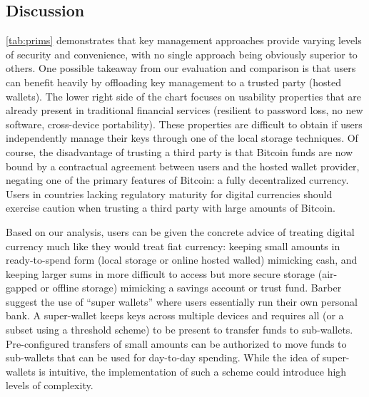 \subsection{Discussion}
\autoref{tab:prims} demonstrates that key management approaches provide varying levels of security and convenience, with no single approach being obviously superior to others. One possible takeaway from our evaluation and comparison is that users can benefit heavily by offloading key management to a trusted party (\eg hosted wallets). The lower right side of the chart focuses on usability properties that are already present in traditional financial services (\ie resilient to password loss, no new software, cross-device portability). These properties are difficult to obtain if users independently manage their keys through one of the local storage techniques. Of course, the disadvantage of trusting a third party is that Bitcoin funds are now bound by a contractual agreement between users and the hosted wallet provider, negating one of the primary features of Bitcoin: a fully decentralized currency. Users in countries lacking regulatory maturity for digital currencies should exercise caution when trusting a third party with large amounts of Bitcoin. 

Based on our analysis, users can be given the concrete advice of treating digital currency much like they would treat fiat currency: keeping small amounts in ready-to-spend form (\eg local storage or online hosted walled) mimicking cash, and keeping larger sums in more difficult to access but more secure storage (\eg air-gapped or offline storage) mimicking a savings account or trust fund. Barber \etal~\cite{Barber2012} suggest the use of ``super wallets'' where users essentially run their own personal bank. A super-wallet keeps keys across multiple devices and requires all (or a subset using a threshold scheme) to be present to transfer funds to sub-wallets. Pre-configured transfers of small amounts can be authorized to move funds to sub-wallets that can be used for day-to-day spending. While the idea of super-wallets is intuitive, the implementation of such a scheme could introduce high levels of complexity. 




